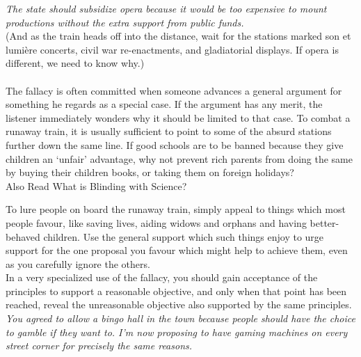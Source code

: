 \documentclass[a4paper,12pt,single,pdftex]{scrartcl}
\begin{document}
    
      {\em The state should subsidize opera because it would be too expensive to mount productions without the extra support from public funds.}
    \\

    
      (And as the train heads off into the distance, wait for the stations marked son et lumière concerts, civil war re-enactments, and gladiatorial displays. If opera is different, we need to know why.)
    \\

    
       
    \\

    
      The fallacy is often committed when someone advances a general argument for something he regards as a special case. If the argument has any merit, the listener immediately wonders why it should be limited to that case. To combat a runaway train, it is usually sufficient to point to some of the absurd stations further down the same line. If good schools are to be banned because they give children an ‘unfair’ advantage, why not prevent rich parents from doing the same by buying their children books, or taking them on foreign holidays?
    \\

    
      

      
        Also Read  What is Blinding with Science?
      
    
    
      To lure people on board the runaway train, simply appeal to things which most people favour, like saving lives, aiding widows and orphans and having better-behaved children. Use the general support which such things enjoy to urge support for the one proposal you favour which might help to achieve them, even as you carefully ignore the others.
    \\

    
      In a very specialized use of the fallacy, you should gain acceptance of the principles to support a reasonable objective, and only when that point has been reached, reveal the unreasonable objective also supported by the same principles.
    \\

    
      {\em You agreed to allow a bingo hall in the town because people should have the choice to gamble if they want to. I’m now proposing to have gaming machines on every street corner for precisely the same reasons.}
    \\
\end{document}
